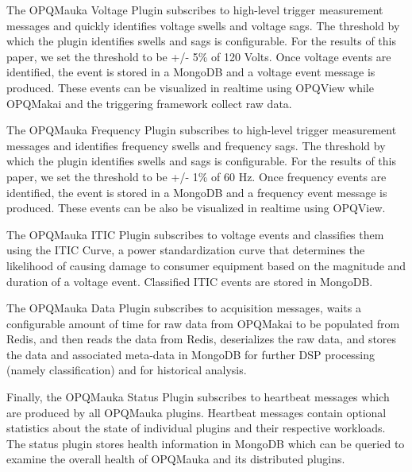 \documentclass[a4paper, conference]{IEEEtran}
\begin{document}
The OPQMauka Voltage Plugin subscribes to high-level trigger measurement messages and quickly identifies voltage swells and voltage sags. The threshold by which the plugin identifies swells and sags is configurable. For the results of this paper, we set the threshold to be +/- 5\% of 120 Volts. Once voltage events are identified, the event is stored in a MongoDB and a voltage event message is produced. These events can be visualized in realtime using OPQView while OPQMakai and the triggering framework collect raw data.

The OPQMauka Frequency Plugin subscribes to  high-level trigger measurement messages and identifies frequency swells and frequency sags. The threshold by which the plugin identifies swells and sags is configurable. For the results of this paper, we set the threshold to be +/- 1\% of 60 Hz. Once frequency events are identified, the event is stored in a MongoDB and a frequency event message is produced. These events can be also be visualized in realtime using OPQView.

The OPQMauka ITIC Plugin subscribes to voltage events and classifies them using the ITIC Curve\cite{ITIC}, a power standardization curve that determines the likelihood of causing damage to consumer equipment based on the magnitude and duration of a voltage event. Classified ITIC events are stored in MongoDB.



The OPQMauka Data Plugin subscribes to acquisition messages, waits a configurable amount of time for raw data from OPQMakai to be populated from Redis, and then reads the data from Redis, deserializes the raw data, and stores the data and associated meta-data in MongoDB for further DSP processing (namely classification) and for historical analysis. 

Finally, the OPQMauka Status Plugin subscribes to heartbeat messages which are produced by all OPQMauka plugins. Heartbeat messages contain optional statistics about the state of individual plugins and their respective workloads. The status plugin stores health information in MongoDB which can be queried to examine the overall health of OPQMauka and its distributed plugins.
\end{document}
